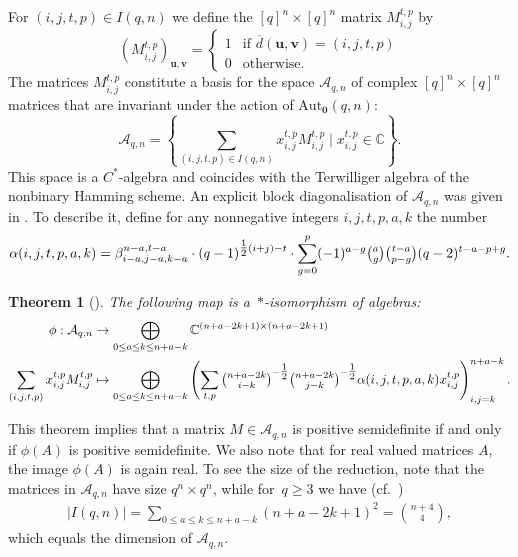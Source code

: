 \documentclass[10pt,a4paper]{article}
\newcommand{\C}{\mathbb{C}}
\newtheorem{theorem}{Theorem}[section]
\theoremstyle{definition}
\newcommand{\uu}{\mathbf{u}}
\newcommand{\vv}{\mathbf{v}}
\newcommand{\zero}{\mathbf{0}}
\newcommand{\AutZ}{\mathrm{Aut}_{\zero}}
\begin{document}
For $(i,j,t,p)\in I(q,n)$ we define the $[q]^n\times [q]^n $ matrix $M_{i,j}^{t,p}$ by 
\[
\left(M_{i,j}^{t,p}\right)_{\uu,\vv}=
\begin{cases}
1& \text{if }\overline{d}(\uu,\vv)=(i,j,t,p)\\
0& \text{otherwise.}
\end{cases}
\]
The matrices $M_{i,j}^{t,p}$ constitute a basis for the space $\mathcal{A}_{q,n}$ of complex $[q]^n\times [q]^n$ matrices that are invariant under the action of $\AutZ(q,n)$: 
\[
\mathcal{A}_{q,n}=\left\{\sum_{(i,j,t,p)\in I(q,n)}x_{i,j}^{t,p}M_{i,j}^{t,p}\mid x_{i,j}^{t,p}\in \C\right\}.
\]
This space is a $C^*$-algebra and coincides with the Terwilliger algebra of the nonbinary Hamming scheme. An explicit block diagonalisation of $\mathcal{A}_{q,n}$ was given in \cite{GST06}. To describe it, define for any nonnegative integers $i,j,t,p,a,k$ the number 
\[
\alpha(i,j,t,p,a,k)=\beta^{n-a,t-a}_{i-a,j-a,k-a}\cdot(q-1)^{\tfrac{1}{2}(i+j)-t}\cdot \sum_{g=0}^p(-1)^{a-g}\tbinom{a}{g}\tbinom{t-a}{p-g}(q-2)^{t-a-p+g}.
\]

\begin{theorem}[\cite{GST06}]\label{thm:blocknonbin}
The following map is a~$*$-isomorphism of algebras: 
\begin{align}
\phi: \mathcal{A}_{q,n} &\to \bigoplus_{0\leq a\leq k\leq n+a-k} \mathbb{C}^{(n+a-2k+1) \times (n+a-2k+1)}  \notag \\
\sum_{(i,j,t,p)} x_{i,j}^{t,p} M_{i,j}^{t,p} &\mapsto \bigoplus_{0\leq a\leq k\leq n+a-k} \left( \sum_{t,p} \tbinom{n+a-2k}{i-k}^{-\tfrac{1}{2}} \tbinom{n+a-2k}{j-k}^{-\tfrac{1}{2}} \alpha(i,j,t,p,a,k) x_{i,j}^{t,p} \right)_{i,j=k}^{n+a-k}. \label{eq:starisononbin}
\end{align}
\end{theorem}
This theorem implies that a matrix $M\in \mathcal{A}_{q,n}$ is positive semidefinite if and only if $\phi(A)$ is positive semidefinite. We also note that for real valued matrices $A$, the image $\phi(A)$ is again real. To see the size of the reduction, note  that the matrices in $\mathcal{A}_{q,n}$ have size $q^n \times q^n$, while for~$q\geq 3$ we have (cf.~\cite{GST06}) \begin{align}| I(q,n)|  = \sum_{0\leq a\leq k\leq n+a-k} (n+a-2k+1)^2= \binom{n+4}{4}, \label{dimAqn}\end{align}  which equals the dimension of $\mathcal{A}_{q,n}$.
\end{document}
